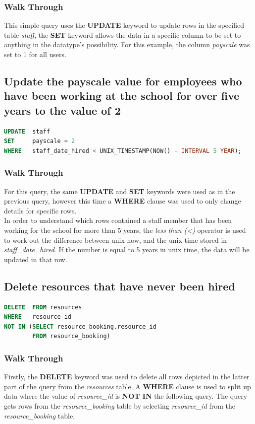 \documentclass{article}
\begin{document}
\subsubsection{Walk Through} This simple query uses the \textbf{UPDATE} keyword to update rows in the specified table \textit{staff}, the \textbf{SET} keyword allows the data in a specific column to be set to anything in the datatype's possibility. For this example, the column \textit{payscale} was set to 1 for all users.

\subsection{Update the payscale value for employees who have been working at the school for over five years to the value of 2}
\begin{lstlisting}[language=sql, caption=Update Payscale, style=mystyle]
UPDATE  staff
SET     payscale = 2
WHERE   staff_date_hired < UNIX_TIMESTAMP(NOW() - INTERVAL 5 YEAR);
\end{lstlisting}

\subsubsection{Walk Through} For this query, the same \textbf{UPDATE} and \textbf{SET} keywords were used as in the previous query, however this time a \textbf{WHERE} clause was used to only change details for specific rows.
\\\newline
In order to understand which rows contained a staff member that has been working for the school for more than 5 years, the \textit{less than (<)} operator is used to work out the difference between \gls{unix} now, and the \gls{unix} time stored in \textit{staff\_date\_hired}. If the number is equal to 5 years in \gls{unix} time, the data will be updated in that row.

\subsection{Delete resources that have never been hired}
\begin{lstlisting}[language=sql, caption=Delete Resources, style=mystyle]
DELETE  FROM resources
WHERE   resource_id 
NOT IN (SELECT resource_booking.resource_id 
        FROM resource_booking)
\end{lstlisting}

\subsubsection{Walk Through} Firstly, the \textbf{DELETE} keyword was used to delete all rows depicted in the latter part of the query from the \textit{resources} table. A \textbf{WHERE} clause is used to split up data where the value of \textit{resource\_id} is \textbf{NOT IN} the following query. The query gets rows from the \textit{resource\_booking} table by selecting \textit{resource\_id} from the \textit{resource\_booking} table.
\end{document}
